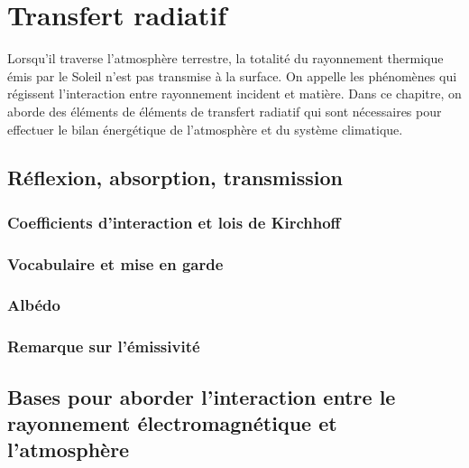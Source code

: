 \chapter{Transfert radiatif}


\bk Lorsqu'il traverse l'atmosphère terrestre, la totalité du rayonnement thermique émis par le Soleil n'est pas transmise à la surface. On appelle  les phénomènes qui régissent l'interaction entre rayonnement incident et matière. Dans ce chapitre, on aborde des éléments de éléments de transfert radiatif qui sont nécessaires pour effectuer le bilan énergétique de l'atmosphère et du système climatique.

\mk \section{Réflexion, absorption, transmission}

	\sk \subsection{Coefficients d'interaction et lois de Kirchhoff}

		

		

	\sk \subsection{Vocabulaire et mise en garde}

		

	\sk \subsection{Albédo}

		

	\sk \subsection{Remarque sur l'émissivité}

		

\mk \section{Bases pour aborder l'interaction entre le rayonnement électromagnétique et l'atmosphère}

